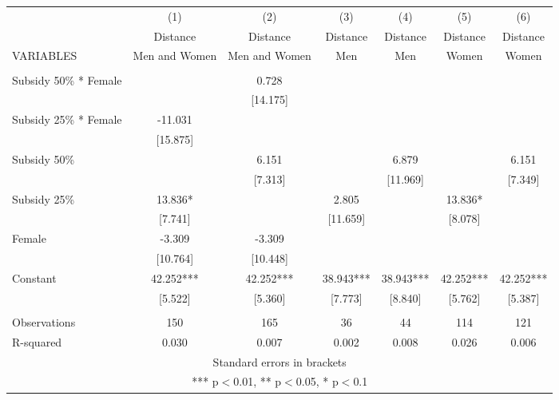 \documentclass[]{article}
\begin{document}
\begin{tabular}{lcccccc} \hline
 & (1) & (2) & (3) & (4) & (5) & (6) \\
 & Distance & Distance & Distance & Distance & Distance & Distance \\
VARIABLES & Men and Women & Men and Women & Men & Men & Women & Women \\ \hline
 &  &  &  &  &  &  \\
Subsidy 50\% * Female &  & 0.728 &  &  &  &  \\
 &  & [14.175] &  &  &  &  \\
Subsidy 25\% * Female & -11.031 &  &  &  &  &  \\
 & [15.875] &  &  &  &  &  \\
Subsidy 50\% &  & 6.151 &  & 6.879 &  & 6.151 \\
 &  & [7.313] &  & [11.969] &  & [7.349] \\
Subsidy 25\% & 13.836* &  & 2.805 &  & 13.836* &  \\
 & [7.741] &  & [11.659] &  & [8.078] &  \\
Female & -3.309 & -3.309 &  &  &  &  \\
 & [10.764] & [10.448] &  &  &  &  \\
Constant & 42.252*** & 42.252*** & 38.943*** & 38.943*** & 42.252*** & 42.252*** \\
 & [5.522] & [5.360] & [7.773] & [8.840] & [5.762] & [5.387] \\
 &  &  &  &  &  &  \\
Observations & 150 & 165 & 36 & 44 & 114 & 121 \\
 R-squared & 0.030 & 0.007 & 0.002 & 0.008 & 0.026 & 0.006 \\ \hline
\multicolumn{7}{c}{ Standard errors in brackets} \\
\multicolumn{7}{c}{ *** p$<$0.01, ** p$<$0.05, * p$<$0.1} \\
\end{tabular}
\end{document}

